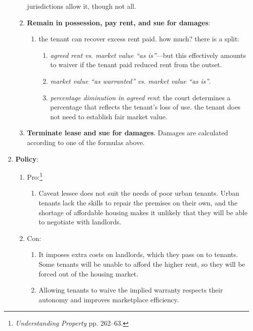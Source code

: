 \begin{enumerate}
\begin{enumerate}
        jurisdictions allow it, though not all.
        \item \textbf{Remain in possession, pay rent, and sue for damages}:
        \begin{enumerate}
            \item the tenant can recover excess rent paid. how much? there is 
            a split:
            \begin{enumerate}
                \item \emph{agreed rent vs. market value ``as is''}---but this 
                effectively amounts to waiver if the tenant paid reduced rent 
                from the outset.
                \item \emph{market value ``as warranted'' vs. market value 
                ``as is''}.
                \item \emph{percentage diminution in agreed rent}: the court 
                determines a percentage that reflects the tenant's loss of 
                use.  the tenant does not need to establish fair market value.
            \end{enumerate}
        \end{enumerate}
        \item \textbf{Terminate lease and sue for damages}. Damages are 
        calculated according to one of the formulas above.
    \end{enumerate}
    \item \textbf{Policy}:
    \begin{enumerate}
        \item Pro:\footnote{\emph{Understanding Property} pp. 262--63.}
        \begin{enumerate}
            \item Caveat lessee does not suit the needs of poor urban tenants.  
            Urban tenants lack the skills to repair the premises on their own, 
            and the shortage of affordable housing makes it unlikely that they 
            will be able to negotiate with landlords.
        \end{enumerate}
        \item Con:
        \begin{enumerate}
            \item It imposes extra costs on landlords, which they pass on to 
            tenants. Some tenants will be unable to afford the higher rent, so 
            they will be forced out of the housing market.
            \item Allowing tenants to waive the implied warranty respects 
            their autonomy and improves marketplace efficiency.
        \end{enumerate}
    \end{enumerate}
\end{enumerate}

